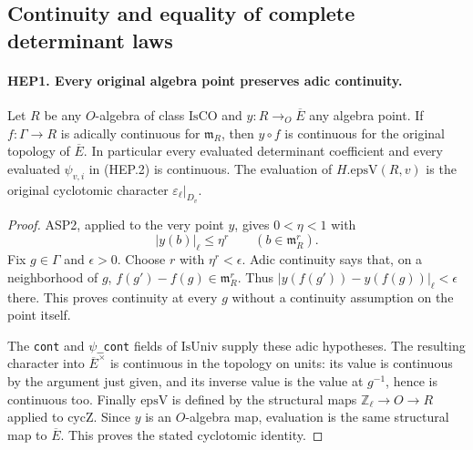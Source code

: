\documentclass[11pt,a4paper]{article}
\numberwithin{equation}{section}
\theoremstyle{remark}\newtheorem{remark}[theorem]{Remark}
\begin{document}
\subsection{Continuity and equality of complete determinant laws}

\paragraph{HEP1. Every original algebra point preserves adic continuity.}
\label{claim:HEP1}
Let $R$ be any $O$-algebra of class $\mathrm{IsCO}$ and
$y:R\to_O\overline E$ any algebra point.  If
$f:\Gamma\to R$ is adically continuous for $\mathfrak m_R$,
then $y\circ f$ is continuous for the original topology of
$\overline E$.  In particular every evaluated determinant
coefficient and every evaluated $\psi_{v,i}$ in (HEP.2) is continuous.
The evaluation of $H.\mathrm{epsV}(R,v)$ is the original
cyclotomic character $\varepsilon_\ell|_{D_v}$.
\begin{proof}
ASP2, applied to the very point $y$, gives $0<\eta<1$ with
\[
             |y(b)|_\ell\leq\eta^r
                  \qquad(b\in\mathfrak m_R^r).
 \tag{HEP.3}
\]
Fix $g\in\Gamma$ and $\epsilon>0$.  Choose $r$ with
$\eta^r<\epsilon$.  Adic continuity says that, on a neighborhood
of $g$, $f(g')-f(g)\in\mathfrak m_R^r$.  Thus
$|y(f(g'))-y(f(g))|_\ell<\epsilon$ there.  This proves continuity
at every $g$ without a continuity assumption on the point itself.

The \texttt{cont} and \texttt{\(\psi\)\_\allowbreak cont} fields of
$\mathrm{IsUniv}$ supply these adic hypotheses.  The resulting
character into $\overline E^\times$ is continuous in the topology
on units: its value is continuous by the argument just given, and
its inverse value is the value at $g^{-1}$, hence is continuous too.
Finally $\mathrm{epsV}$ is defined by the structural maps
$\mathbb Z_\ell\to O\to R$ applied to $\mathrm{cycZ}$.
Since $y$ is an $O$-algebra map, evaluation is the same structural
map to $\overline E$.  This proves the stated cyclotomic identity.
\end{proof}

\end{document}
